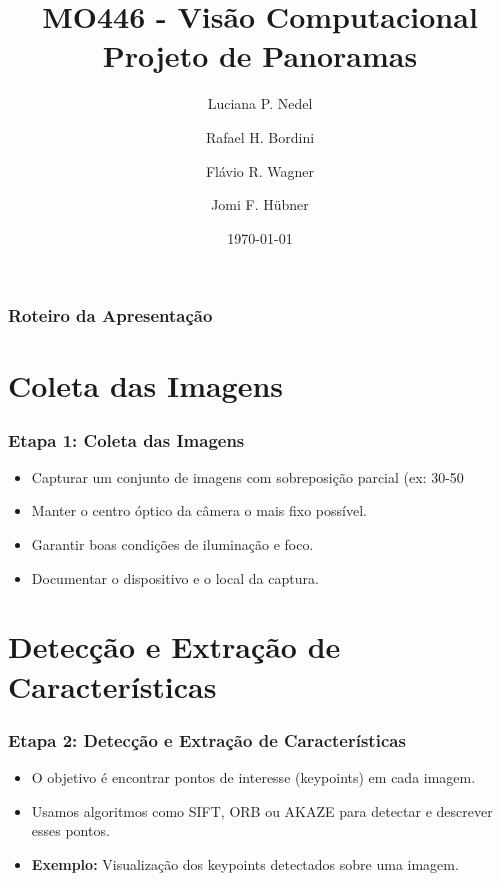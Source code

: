 \documentclass{beamer}
\title[Panoramas]{MO446 - Visão Computacional \\ Projeto de Panoramas}
\author{Luciana P. Nedel \and Rafael H. Bordini \and Flávio R. Wagner \and Jomi F. Hübner}
\institute[UFRGS, Durham, FURB]{}
\date{\today}
\begin{document}
\begin{frame}
  \titlepage
\end{frame}

\begin{frame}
  \frametitle{Roteiro da Apresentação}
  \tableofcontents
\end{frame}

\section{Coleta das Imagens}
\begin{frame}
  \frametitle{Etapa 1: Coleta das Imagens}
  \begin{itemize}
    \item<1-> Capturar um conjunto de imagens com sobreposição parcial (ex: 30-50%
    \item<2-> Manter o centro óptico da câmera o mais fixo possível.
    \item<3-> Garantir boas condições de iluminação e foco.
    \item<4-> Documentar o dispositivo e o local da captura.
  \end{itemize}
\end{frame}

\section{Detecção e Extração de Características}
\begin{frame}
  \frametitle{Etapa 2: Detecção e Extração de Características}
  \begin{itemize}
    \item<1-> O objetivo é encontrar pontos de interesse (keypoints) em cada imagem.
    \item<2-> Usamos algoritmos como SIFT, ORB ou AKAZE para detectar e descrever esses pontos.
    \item<3-> \textbf{Exemplo:} Visualização dos keypoints detectados sobre uma imagem.
  \end{itemize}
  \begin{figure}
  \end{figure}
\end{frame}
\end{document}

